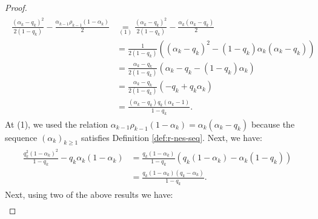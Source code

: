 \documentclass[12pt]{article}
\begin{document}
        \begin{proof}
            \begin{align}\label{eqn:cnvg-prep-part2-eqn1}
                \begin{split}
                    \frac{(\alpha_k - q_k)^2}{2(1 - q_k)}
                    - \frac{\alpha_{k - 1}\rho_{k - 1}(1 - \alpha_k)}{2}
                    &\underset{(1)}{=} 
                    \frac{(\alpha_k - q_k)^2}{2(1 - q_k)}
                    - \frac{\alpha_k(\alpha_k - q_k)}{2}
                    \\
                    &= \frac{1}{2(1 - q_k)}\left(
                        (\alpha_k - q_k)^2 - (1 - q_k)\alpha_k(\alpha_k - q_k)
                    \right)
                    \\
                    &= \frac{\alpha_k - q_k}{2(1 - q_k)}
                    \left(
                        \alpha_k - q_k - (1 - q_k)\alpha_k
                    \right)
                    \\
                    &= 
                    \frac{\alpha_k - q_k}{2(1 - q_k)}
                    \left(
                        - q_k + q_k \alpha_k
                    \right)
                    \\
                    &= \frac{(\alpha_k -q_k)q_k (\alpha_k - 1)}{1 - q_k}. 
                \end{split}
            \end{align}
            At (1), we used the relation $\alpha_{k - 1} \rho_{k - 1}(1 - \alpha_k) = \alpha_k(\alpha_k - q_k)$ because the sequence $(\alpha_k)_{k \ge 1}$ satisfies Definition \ref{def:r-nes-seq}.
            Next, we have: 
            \begin{align}\label{eqn:cnvg-prep-part2-eqn2}
                \begin{split}
                    \frac{q_k^2(1 - \alpha_k)^2}{1 - q_k}
                    - q_k\alpha_k(1 - \alpha_k)
                    &= 
                    \frac{q_k(1 - \alpha_k)}{1 - q_k}
                    \left(
                        q_k(1 - \alpha_k) - \alpha_k(1 - q_k)
                    \right)
                    \\
                    &= 
                    \frac{q_k(1 - \alpha_k)(q_k - \alpha_k)}{1 - q_k}. 
                \end{split}
            \end{align}
            Next, using two of the above results we have: 
            {\allowdisplaybreaks\small
            \begin{align*}

\end{align*}}
\end{proof}
\end{document}
